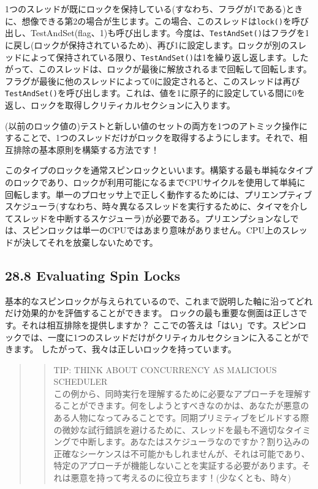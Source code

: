 1つのスレッドが既にロックを保持している(すなわち、フラグが1である)ときに、想像できる第2の場合が生じます。この場合、このスレッドは\texttt{lock()}を呼び出し、TestAndSet(flag、1)も呼び出します。今度は、\texttt{TestAndSet()}はフラグを1に戻し(ロックが保持されているため)、再び1に設定します。ロックが別のスレッドによって保持されている限り、\texttt{TestAndSet()}は1を繰り返し返します。したがって、このスレッドは、ロックが最後に解放されるまで回転して回転します。フラグが最後に他のスレッドによって0に設定されると、このスレッドは再び\texttt{TestAndSet()}を呼び出します。これは、値を1に原子的に設定している間に0を返し、ロックを取得しクリティカルセクションに入ります。

(以前のロック値の)テストと新しい値のセットの両方を1つのアトミック操作にすることで、1つのスレッドだけがロックを取得するようにします。それで、相互排除の基本原則を構築する方法です！

このタイプのロックを通常スピンロックといいます。構築する最も単純なタイプのロックであり、ロックが利用可能になるまでCPUサイクルを使用して単純に回転します。単一のプロセッサ上で正しく動作するためには、プリエンプティブスケジューラ(すなわち、時々異なるスレッドを実行するために、タイマを介してスレッドを中断するスケジューラ)が必要である。プリエンプションなしでは、スピンロックは単一のCPUではあまり意味がありません。CPU上のスレッドが決してそれを放棄しないためです。

\hypertarget{evaluating-spin-locks}{%
\subsection*{28.8 Evaluating Spin Locks}\label{evaluating-spin-locks}}

基本的なスピンロックが与えられているので、これまで説明した軸に沿ってどれだけ効果的かを評価することができます。
ロックの最も重要な側面は正しさです。それは相互排除を提供しますか？
ここでの答えは「はい」です。スピンロックでは、一度に1つのスレッドだけがクリティカルセクションに入ることができます。
したがって、我々は正しいロックを持っています。

\begin{quote}
\begin{quote}
TIP: THINK ABOUT CONCURRENCY AS MALICIOUS SCHEDULER\\
この例から、同時実行を理解するために必要なアプローチを理解することができます。何をしようとすべきなのかは、あなたが悪意のある人物になってみることです。同期プリミティブをビルドする際の微妙な試行錯誤を避けるために、スレッドを最も不適切なタイミングで中断します。あなたはスケジューラなのですか？割り込みの正確なシーケンスは不可能かもしれませんが、それは可能であり、特定のアプローチが機能しないことを実証する必要があります。それは悪意を持って考えるのに役立ちます！(少なくとも、時々)
\end{quote}
\end{quote}

